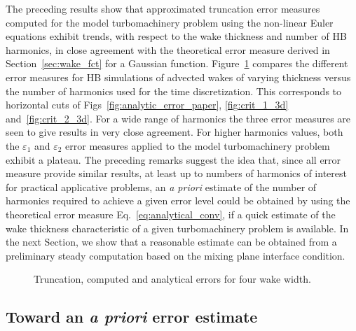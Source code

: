 The preceding results show that approximated truncation error 
measures computed for the model turbomachinery problem 
using the non-linear Euler equations
exhibit trends, with respect to the wake thickness 
and number of HB harmonics, in close agreement with the 
theoretical error measure derived in Section~\ref{sec:wake_fct}
for a Gaussian function. 
Figure~\ref{fig:error_comp_curves} compares the 
different error measures for HB simulations of 
advected wakes of varying thickness versus 
the number of harmonics used for the time discretization. 
This corresponds to horizontal cuts of Figs~\ref{fig:analytic_error_paper}, 
\ref{fig:crit_1_3d} and~\ref{fig:crit_2_3d}. 
For a wide range of harmonics 
the three error measures are seen to give 
results in very close agreement. For higher harmonics values, 
both the $\varepsilon_1$ and $\varepsilon_2$ error 
measures applied to the model turbomachinery problem 
exhibit a plateau.
The preceding remarks suggest the idea that, 
since all error measure provide similar results, 
at least up to numbers of harmonics of interest for 
practical applicative problems, an \emph{a priori} 
estimate of the number of harmonics required 
to achieve a given error level could be 
obtained by using the theoretical error measure 
Eq.~\eqref{eq:analytical_conv}, if a quick 
estimate of the wake thickness characteristic 
of a given turbomachinery problem is available. 
In the next Section, we show that a reasonable 
estimate can be obtained from a preliminary steady 
computation based on the mixing plane interface condition.
\begin{figure}[htp]
  \centering
  \quad
  \quad
  \quad
  \quad
  \caption{Truncation, computed and analytical errors for four wake width.}
  \label{fig:error_comp_curves}
\end{figure}

\subsection{Toward an \emph{a priori} error estimate}
\label{sub:prediction_tool_azimuthal_fft}

